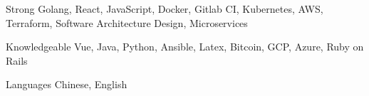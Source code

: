 

\begin{cvskills}

  \cvskill
    {Strong} %
    {Golang, React, JavaScript, Docker, Gitlab CI, Kubernetes, AWS, Terraform, Software Architecture Design, Microservices} %

  \cvskill
    {Knowledgeable} %
    {Vue, Java, Python, Ansible, Latex, Bitcoin, GCP, Azure, Ruby on Rails} %

  \cvskill
    {Languages} %
    {Chinese, English} %

\end{cvskills}
